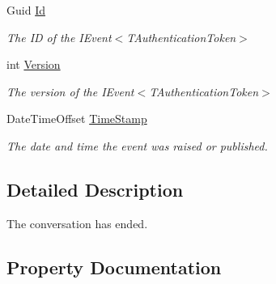 \begin{DoxyCompactItemize}
Guid \hyperlink{classCqrs_1_1Akka_1_1Tests_1_1Unit_1_1Events_1_1ConversationEnded_ae8a319553a4df63661afcef6bcadd963_ae8a319553a4df63661afcef6bcadd963}{Id}
\begin{DoxyCompactList}\small\item\em The ID of the I\+Event$<$\+T\+Authentication\+Token$>$ \end{DoxyCompactList}\item 
int \hyperlink{classCqrs_1_1Akka_1_1Tests_1_1Unit_1_1Events_1_1ConversationEnded_a08eef17f722c411bea6ad6adb871ddfb_a08eef17f722c411bea6ad6adb871ddfb}{Version}
\begin{DoxyCompactList}\small\item\em The version of the I\+Event$<$\+T\+Authentication\+Token$>$ \end{DoxyCompactList}\item 
Date\+Time\+Offset \hyperlink{classCqrs_1_1Akka_1_1Tests_1_1Unit_1_1Events_1_1ConversationEnded_a26f068ae3ca8f1e84277f133f8fc4620_a26f068ae3ca8f1e84277f133f8fc4620}{Time\+Stamp}
\begin{DoxyCompactList}\small\item\em The date and time the event was raised or published. \end{DoxyCompactList}\end{DoxyCompactItemize}


\subsection{Detailed Description}
The conversation has ended. 



\subsection{Property Documentation}
\mbox{\label{classCqrs_1_1Akka_1_1Tests_1_1Unit_1_1Events_1_1ConversationEnded_a025b7df73452f8e22337eabc4d11fab9_a025b7df73452f8e22337eabc4d11fab9}} 
